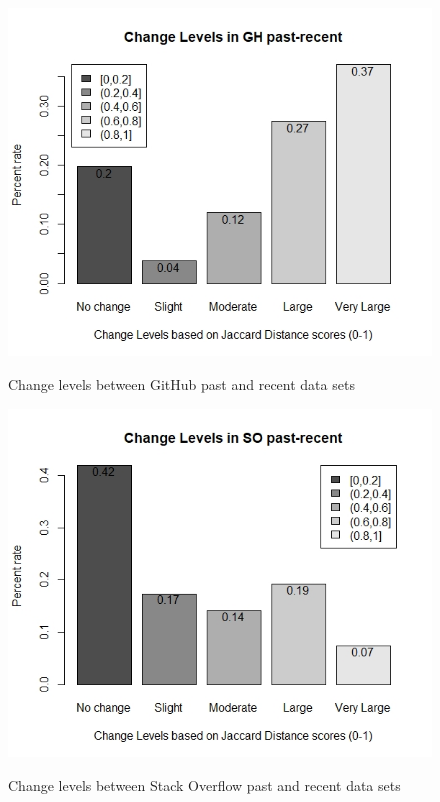         
        \begin{figure}
          \centering
          \includegraphics[width=\textwidth]{figures/change_level_GH_past-recent.jpeg}\\
          \caption{Change levels between GitHub past and recent data sets}
          \label{fig:change_GH_past_recent}
        \end{figure}
        
        \begin{figure}
          \centering
          \includegraphics[width=\textwidth]{figures/change_levels_SO_past-recent.jpeg}\\
          \caption{Change levels between Stack Overflow past and recent data sets}
          \label{fig:change_SO_past_recent}
        \end{figure}